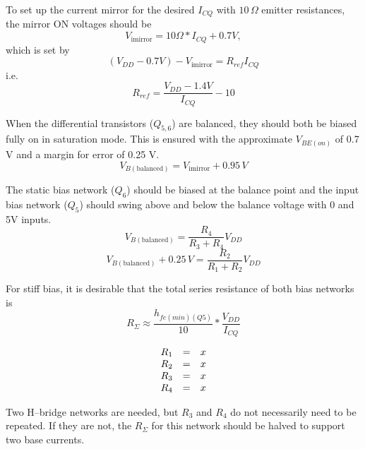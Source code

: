 \documentclass[10pt, twocolumn]{article}
\begin{document}
To set up the current mirror for the desired $I_{CQ}$ with $10\,\Omega$ emitter resistances,
the mirror ON voltages should be
\begin{equation}
V_{\textrm{imirror}}=10\Omega*I_{CQ}+0.7V,
\label{mirror-on-voltages}
\end{equation}
which is set by
\begin{equation*}
(V_{DD}-0.7V)-V_{\textrm{imirror}}=R_{ref}I_{CQ}
\end{equation*}
i.e.
\begin{equation}
R_{ref}=\frac{V_{DD}-1.4V}{I_{CQ}}-10
\label{Rref-eq}
\end{equation}

When the differential transistors ($Q_{5,6}$) are balanced,
they should both be biased fully on in saturation mode.
This is ensured with the approximate $V_{BE(on)}$ of 0.7 V and
a margin for error of 0.25 V.
\begin{equation*}
V_{B(\textrm{balanced})}=V_{\textrm{imirror}}+0.95\,V
\end{equation*}

The static bias network ($Q_{6}$) should be biased at the balance point
and the input bias network ($Q_{5}$) should swing above and below the
balance voltage with 0 and 5V inputs.
\begin{equation*}
V_{B(\textrm{balanced})}=\frac{R_{4}}{R_{3}+R_{4}}V_{DD}
\end{equation*}
\begin{equation*}
V_{B(\textrm{balanced})}+0.25\,V=\frac{R_{2}}{R_{1}+R_{2}}V_{DD}
\end{equation*}

For stiff bias, it is desirable that the total series resistance of
both bias networks is
\begin{equation*}
R_{\Sigma}\approx \frac{h_{fe(min)(Q5)}}{10}*\frac{V_{DD}}{I_{CQ}}
\end{equation*}

\begin{equation}
\begin{array}{r c l}
R_{1}	&=&	x\\
R_{2}	&=&	x\\
R_{3}	&=&	x\\
R_{4}	&=&	x\\
\end{array}
\label{Rbias12-eq}
\end{equation}

Two H--bridge networks are needed, but $R_{3}$ and $R_{4}$ do not
necessarily need to be repeated. If they are not, the $R_{\Sigma}$
for this network should be halved to support two base currents.
\end{document}
